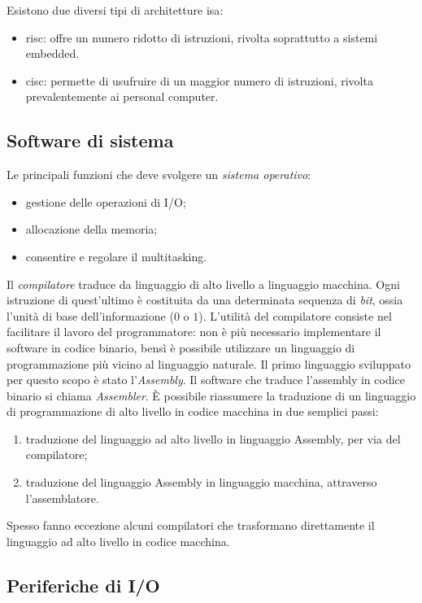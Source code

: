 \documentclass[class=book, crop=false, oneside]{standalone}
\begin{document}
Esistono due diversi tipi di architetture \acrshort{isa}:
\begin{itemize}[noitemsep]
	\item \acrshort{risc}: offre un numero ridotto di istruzioni, rivolta soprattutto a sistemi embedded.
	\item \acrshort{cisc}: permette di usufruire di un maggior numero di istruzioni, rivolta prevalentemente ai personal computer.
\end{itemize}

\subsection{Software di sistema}
Le principali funzioni che deve svolgere un \emph{sistema operativo}:
\begin{itemize}[noitemsep]
	\item gestione delle operazioni di I/O;
	\item allocazione della memoria;
	\item consentire e regolare il multitasking.
\end{itemize}

Il \emph{compilatore} traduce da linguaggio di alto livello a linguaggio macchina. Ogni istruzione di quest'ultimo è costituita da una determinata sequenza di \emph{bit}, ossia l'unità di base dell'informazione (\(0\) o \(1\)).
L'utilità del compilatore consiste nel facilitare il lavoro del programmatore: non è più necessario implementare il software in codice binario, bensì è possibile utilizzare un linguaggio di programmazione più vicino al linguaggio naturale.
Il primo linguaggio sviluppato per questo scopo è stato l'\emph{Assembly}.
Il software che traduce l'assembly in codice binario si chiama \emph{Assembler}.
\`{E} possibile riassumere la traduzione di un linguaggio di programmazione di alto livello in codice macchina in due semplici passi:
\begin{enumerate}[noitemsep]
	\item traduzione del linguaggio ad alto livello in linguaggio Assembly, per via del compilatore;
	\item traduzione del linguaggio Assembly in linguaggio macchina, attraverso l'assemblatore.
\end{enumerate}

Spesso fanno eccezione alcuni compilatori che trasformano direttamente il linguaggio ad alto livello in codice macchina.

\subsection{Periferiche di I/O}
\end{document}
